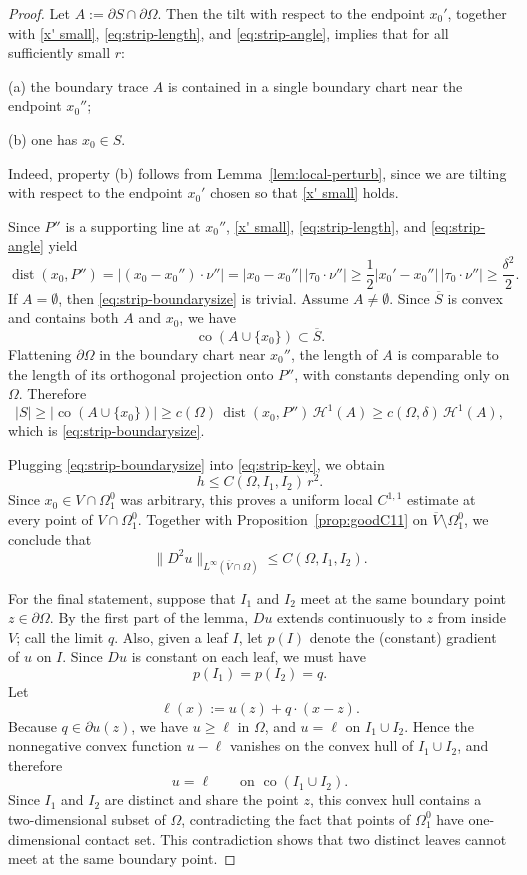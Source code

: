\documentclass[reqno,11pt]{amsart}
\def\dist{{\mathop\mathrm{dist}}}
\numberwithin{equation}{section}
\theoremstyle{remark}
\begin{document}
\begin{proof}
Let
$A:=\partial S\cap\partial\Omega.$
Then the tilt with respect to the endpoint \(x_0'\), together with
\eqref{x' small}, \eqref{eq:strip-length}, and \eqref{eq:strip-angle}, implies
that for all sufficiently small \(r\):

\smallskip
\noindent
(a) the boundary trace \(A\) is contained in a single boundary chart near the
endpoint \(x_0''\);

\smallskip
\noindent
(b) one has \(x_0\in S\).

Indeed, property (b) follows from Lemma~\ref{lem:local-perturb}, since we are
tilting with respect to the endpoint \(x_0'\) chosen so that
\eqref{x' small} holds.

Since \(P''\) is a supporting line at \(x_0''\), \eqref{x' small},
\eqref{eq:strip-length}, and \eqref{eq:strip-angle} yield
\[
\dist(x_0,P'')
=
|(x_0-x_0'')\cdot \nu''|
=
|x_0-x_0''|\,|\tau_0\cdot \nu''|
\ge \frac12 |x_0'-x_0''|\,|\tau_0\cdot \nu''|
\ge \frac{\delta^2}{2}.
\]
If \(A=\emptyset\), then \eqref{eq:strip-boundarysize} is trivial. Assume
\(A\neq\emptyset\). Since \(\overline S\) is convex and contains both \(A\) and
\(x_0\), we have
\[
\operatorname{co}(A\cup\{x_0\})\subset \overline S.
\]
Flattening \(\partial\Omega\) in the boundary chart near \(x_0''\), the length
of \(A\) is comparable to the length of its orthogonal projection onto \(P''\),
with constants depending only on \(\Omega\). Therefore
\[
|S|
\ge \bigl|\operatorname{co}(A\cup\{x_0\})\bigr|
\ge c(\Omega)\,\dist(x_0,P'')\,\mathscr H^1(A)
\ge c(\Omega,\delta)\,\mathscr H^1(A),
\]
which is \eqref{eq:strip-boundarysize}.

Plugging \eqref{eq:strip-boundarysize} into \eqref{eq:strip-key}, we obtain
\[
h\le C(\Omega,I_1,I_2)\,r^2.
\]
Since \(x_0\in V\cap \Omega_1^0\) was arbitrary, this proves a uniform local
\(C^{1,1}\) estimate at every point of \(V\cap \Omega_1^0\). Together with
Proposition~\ref{prop:goodC11} on \(\overline V\setminus \Omega_1^0\), we
conclude that
\[
\|D^2u\|_{L^\infty(\overline V\cap\Omega)}\le C(\Omega,I_1,I_2).
\]

For the final statement, suppose that \(I_1\) and \(I_2\) meet at the same
boundary point \(z\in\partial\Omega\). By the first part of the lemma,
\(Du\) extends continuously to \(z\) from inside \(V\); call the limit \(q\).
Also, given a leaf \(I\), let \(p(I)\) denote the (constant) gradient of \(u\)
on \(I\). Since \(Du\) is constant on each leaf, we must have
\[
p(I_1)=p(I_2)=q.
\]
Let
\[
\ell(x):=u(z)+q\cdot (x-z).
\]
Because \(q\in \partial u(z)\), we have \(u\ge \ell\) in \(\Omega\), and
\(u=\ell\) on \(I_1\cup I_2\). Hence the nonnegative convex function
\(u-\ell\) vanishes on the convex hull of \(I_1\cup I_2\), and therefore
\[
u=\ell \qquad\text{on } \operatorname{co}(I_1\cup I_2).
\]
Since \(I_1\) and \(I_2\) are distinct and share the point \(z\), this convex
hull contains a two-dimensional subset of \(\Omega\), contradicting the fact
that points of \(\Omega_1^0\) have one-dimensional contact set. This
contradiction shows that two distinct leaves cannot meet at the same boundary
point.
\end{proof}
\end{document}
